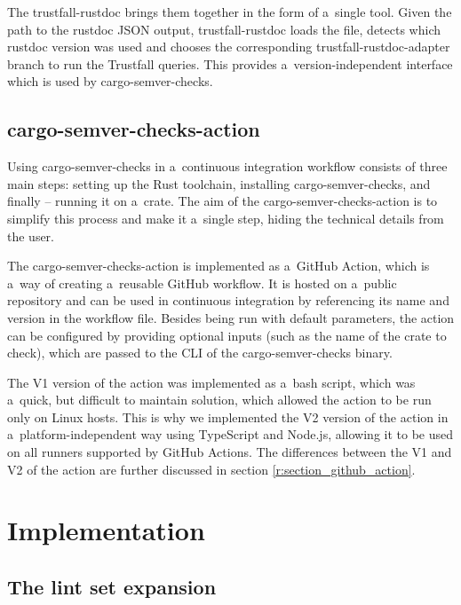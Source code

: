 \documentclass[licencjacka,en]{pracamgr}
\begin{document}
The trustfall-rustdoc brings them together in the form of a~single tool. Given the path to
the rustdoc JSON output, trustfall-rustdoc loads the file, detects which rustdoc version was used
and chooses the corresponding trustfall-rustdoc-adapter branch to run the Trustfall queries.
This provides a~version-independent interface which is used by cargo-semver-checks.

\section{cargo-semver-checks-action}\label{r:section_cargo_semver_checks_action}

Using cargo-semver-checks in a~continuous integration workflow consists of three main steps:
setting up the Rust toolchain, installing cargo-semver-checks, and finally -- running it
on a~crate. The aim of the cargo-semver-checks-action is to simplify this process and make it
a~single step, hiding the technical details from the user.

The cargo-semver-checks-action is implemented as a~GitHub Action, which is a~way of creating
a~reusable GitHub workflow. It is hosted on a~public repository and can be used in continuous
integration by referencing its name and version in the workflow file. Besides being run
with default parameters, the action can be configured by providing optional inputs (such as
the name of the crate to check), which are passed to the CLI of the cargo-semver-checks binary.

The V1 version of the action was implemented as a~bash script, which was a~quick, but difficult
to maintain solution, which allowed the action to be run only on Linux hosts. This is why
we implemented the V2 version of the action in a~platform-independent way using TypeScript
and Node.js, allowing it to be used on all runners supported by GitHub Actions.
The differences between the V1 and V2 of the action are further discussed in section
\ref{r:section_github_action}.



\chapter{Implementation}\label{r:chapter_implementation}

\section{The lint set expansion}\label{r:section_new_lints}
\end{document}
